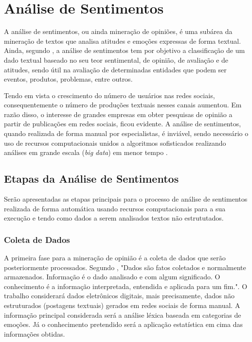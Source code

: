 \chapter{Análise de Sentimentos}
\label{cap:REFERENCIAL}

A análise de sentimentos, ou ainda mineração de opiniões, é uma subárea da mineração de textos que analisa atitudes e emoções expressas de forma textual. Ainda, segundo , a análise de sentimentos tem por objetivo a classificação de um dado textual baseado no seu teor sentimental, de opinião, de avaliação e de atitudes, sendo útil na avaliação de determinadas entidades que podem ser eventos, produtos, problemas, entre outros. 

Tendo em vista o crescimento do número de usuários nas redes sociais, consequentemente o número de produções textuais nesses canais aumentou. Em razão disso, o interesse de grandes empresas em obter pesquisas de opinião a partir de publicações em redes sociais, ficou evidente. A análise de sentimentos, quando realizada de forma manual por especialistas, é inviável, sendo necessário o uso de recursos computacionais unidos a algoritmos sofisticados realizando análises em grande escala (\textit{big data}) em menor tempo \cite{BAHRI2018669}.

\section{Etapas da Análise de Sentimentos}

Serão apresentadas as etapas principais para o processo de análise de sentimentos realizada de forma automática usando recursos computacionais para a sua execução e tendo como dados a serem analisados textos não estrututados.

\subsection{Coleta de Dados}
\label{subsec:coletadados}
A primeira fase para a mineração de opinião é a coleta de dados que serão posteriormente processados. Segundo , "Dados são fatos coletados e normalmente armazenados. Informação é o dado analisado e com algum significado. O conhecimento é a informação interpretada, entendida e aplicada para um fim.". O trabalho considerará dados eletrônicos digitais, mais precisamente, dados não estruturados (postagens textuais) gerados em redes sociais de forma manual. A informação principal considerada será a análise léxica baseada em categorias de emoções. Já o conhecimento pretendido será a aplicação estatística em cima das informações obtidas.

